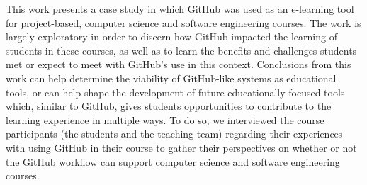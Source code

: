 


This work presents a case study in which GitHub was used as an e-learning tool for project-based, computer science and software engineering courses. The work is largely exploratory in order to discern how GitHub impacted the learning of students in these courses, as well as to learn the benefits and challenges students met or expect to meet with GitHub's use in this context. Conclusions from this work can help determine the viability of GitHub-like systems as educational tools, or can help shape the development of future educationally-focused tools which, similar to GitHub, gives students opportunities to contribute to the learning experience in multiple ways. To do so, we interviewed the course participants (the students and the teaching team) regarding their experiences with using GitHub in their course to gather their perspectives on whether or not the GitHub workflow can support computer science and software engineering courses.

